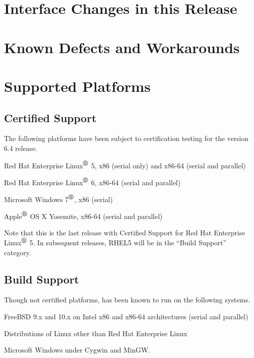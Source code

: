\documentclass{article}
\begin{document}
\newpage
\section{Interface Changes in this Release}



\newpage
\section{Known Defects and Workarounds}



\newpage
\section{Supported Platforms}
\subsection*{Certified Support}
The following platforms have been subject to certification testing for the
\Xyce{} version 6.4 release.
\begin{XyceItemize}
  \item Red Hat Enterprise Linux${}^{\mbox{\textregistered}}$ 5, x86 (serial only) and x86-64 (serial and parallel)
  \item Red Hat Enterprise Linux${}^{\mbox{\textregistered}}$ 6, x86-64 (serial and parallel)
  \item Microsoft Windows 7${}^{\mbox{\textregistered}}$, x86 (serial)
  \item Apple${}^{\mbox{\textregistered}}$ OS X Yosemite, x86-64 (serial and parallel)
\end{XyceItemize}
Note that this is the last release with Certified Support for Red Hat
Enterprise Linux${}^{\mbox{\textregistered}}$ 5. In subsequent releases, RHEL5
will be in the ``Build Support'' category.

\subsection*{Build Support}
Though not certified platforms, \Xyce{} has been known to run on the following
systems.
\begin{XyceItemize}
  \item FreeBSD 9.x and 10.x on Intel x86 and x86-64 architectures (serial and parallel)
  \item Distributions of Linux other than Red Hat Enterprise Linux
  \item Microsoft Windows under Cygwin and MinGW.
\end{XyceItemize}
\end{document}
